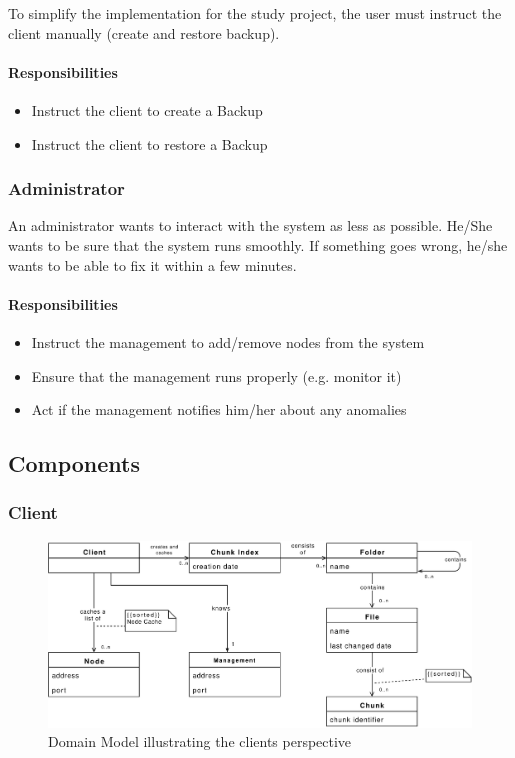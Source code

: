 To simplify the implementation for the study project, the \gls{user} must instruct the \gls{client} manually (create and restore backup).

\paragraph{Responsibilities}
\begin{itemize}
    \item Instruct the \gls{client} to create a Backup
    \item Instruct the \gls{client} to restore a Backup
\end{itemize}


\subsubsection{Administrator}
An \gls{administrator} wants to interact with the \gls{system} as less as possible. He/She wants to be sure that the \gls{system} runs smoothly. If something goes wrong, he/she wants to be able to fix it within a few minutes.

\paragraph{Responsibilities}
\begin{itemize}
    \item Instruct the \gls{management} to add/remove \glspl{node} from the \gls{system}
    \item Ensure that the \gls{management} runs properly (e.g. monitor it)
    \item Act if the \gls{management} notifies him/her about any anomalies
\end{itemize}

\subsection{Components}

\subsubsection{Client}\label{sec:component-client}

\begin{figure}[h]
    \centering
    \includegraphics[width=1\linewidth]{resources/client_domain_model}
    \caption[Client Domain Model]{Domain Model illustrating the \glspl{client} perspective}
\end{figure}

